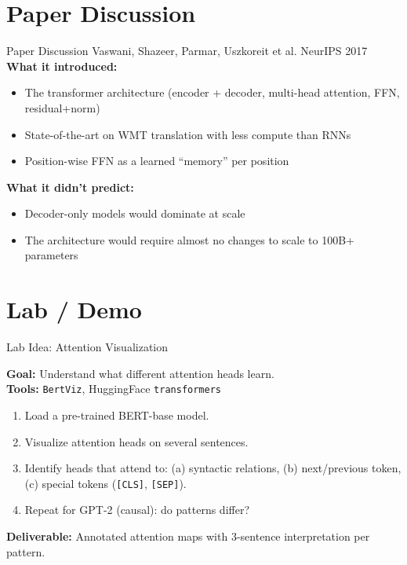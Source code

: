 \documentclass[aspectratio=169,10pt]{beamer}
\begin{document}
\section{Paper Discussion}
\begin{frame}{Paper Discussion}
    {Vaswani, Shazeer, Parmar, Uszkoreit et al.}
    {NeurIPS 2017~\cite{vaswani2017attention}}
  \vspace{0.4em}
  \textbf{What it introduced:}
  \begin{itemize}
    \item The transformer architecture (encoder + decoder, multi-head attention, FFN, residual+norm)
    \item State-of-the-art on WMT translation with less compute than RNNs
    \item Position-wise FFN as a learned ``memory'' per position
  \end{itemize}
  \vspace{0.3em}
  \textbf{What it didn't predict:}
  \begin{itemize}
    \item Decoder-only models would dominate at scale
    \item The architecture would require almost no changes to scale to 100B+ parameters
  \end{itemize}
\end{frame}

\section{Lab / Demo}
\begin{frame}{Lab Idea: Attention Visualization}
  \begin{tcolorbox}[hitbox, title=Lab 2 — Attention Pattern Analysis]
    \textbf{Goal:} Understand what different attention heads learn.\\[4pt]
    \textbf{Tools:} \texttt{BertViz}, HuggingFace \texttt{transformers}
    \begin{enumerate}
      \item Load a pre-trained BERT-base model.
      \item Visualize attention heads on several sentences.
      \item Identify heads that attend to: (a) syntactic relations, (b) next/previous token, (c) special tokens (\texttt{[CLS]}, \texttt{[SEP]}).
      \item Repeat for GPT-2 (causal): do patterns differ?
    \end{enumerate}
    \textbf{Deliverable:} Annotated attention maps with 3-sentence interpretation per pattern.
  \end{tcolorbox}
\end{frame}
\end{document}
